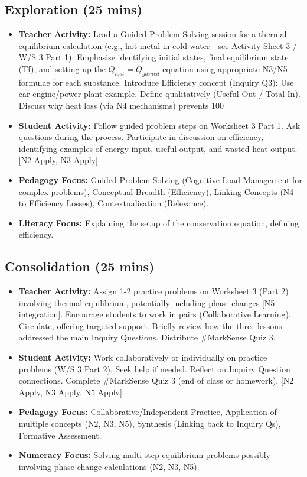 \documentclass[11pt, a4paper]{article}
\begin{document}
\subsection*{Exploration (25 mins)}
\begin{itemize}
    \item \textbf{Teacher Activity:} Lead a Guided Problem-Solving session for a thermal equilibrium calculation (e.g., hot metal in cold water - see Activity Sheet 3 / W/S 3 Part 1). Emphasise identifying initial states, final equilibrium state (Tf), and setting up the $Q_{lost} = Q_{gained}$ equation using appropriate N3/N5 formulae for each substance. Introduce Efficiency concept (Inquiry Q3): Use car engine/power plant example. Define qualitatively (Useful Out / Total In). Discuss why heat loss (via N4 mechanisms) prevents 100%
    \item \textbf{Student Activity:} Follow guided problem steps on Worksheet 3 Part 1. Ask questions during the process. Participate in discussion on efficiency, identifying examples of energy input, useful output, and wasted heat output. [N2 Apply, N3 Apply]
    \item \textbf{Pedagogy Focus:} Guided Problem Solving (Cognitive Load Management for complex problems), Conceptual Breadth (Efficiency), Linking Concepts (N4 to Efficiency Losses), Contextualisation (Relevance).
    \item \textbf{Literacy Focus:} Explaining the setup of the conservation equation, defining efficiency.
\end{itemize}

\subsection*{Consolidation (25 mins)}
\begin{itemize}
    \item \textbf{Teacher Activity:} Assign 1-2 practice problems on Worksheet 3 (Part 2) involving thermal equilibrium, potentially including phase changes [N5 integration]. Encourage students to work in pairs (Collaborative Learning). Circulate, offering targeted support. Briefly review how the three lessons addressed the main Inquiry Questions. Distribute \#MarkSense Quiz 3.
    \item \textbf{Student Activity:} Work collaboratively or individually on practice problems (W/S 3 Part 2). Seek help if needed. Reflect on Inquiry Question connections. Complete \#MarkSense Quiz 3 (end of class or homework). [N2 Apply, N3 Apply, N5 Apply]
    \item \textbf{Pedagogy Focus:} Collaborative/Independent Practice, Application of multiple concepts (N2, N3, N5), Synthesis (Linking back to Inquiry Qs), Formative Assessment.
    \item \textbf{Numeracy Focus:} Solving multi-step equilibrium problems possibly involving phase change calculations (N2, N3, N5).
\end{itemize}
\end{document}
